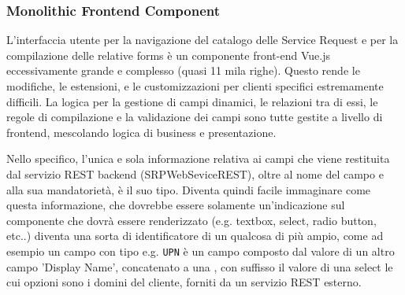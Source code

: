 \subsubsection{Monolithic Frontend Component}
L'interfaccia utente per la navigazione del catalogo delle Service Request e per la compilazione delle relative forms è un componente front-end Vue.js eccessivamente grande e complesso (quasi 11 mila righe). Questo rende le modifiche, le estensioni,  e le customizzazioni per clienti specifici estremamente difficili. La logica per la gestione di campi dinamici, le relazioni tra di essi, le regole di compilazione e la validazione dei campi sono tutte gestite a livello di frontend, mescolando logica di business e presentazione. 

Nello specifico, l'unica e sola informazione relativa ai campi che viene restituita dal servizio REST backend (SRPWebSeviceREST), oltre al nome del campo e alla sua mandatorietà, è il suo tipo. Diventa quindi facile immaginare come questa informazione, che dovrebbe essere solamente un'indicazione sul componente che dovrà essere renderizzato (e.g. textbox, select, radio button, etc..) diventa una sorta di identificatore di un qualcosa di più ampio, come ad esempio un campo con tipo e.g. \texttt{UPN} è un campo composto dal valore di un altro campo 'Display Name', concatenato a una \@, con suffisso il valore di una select le cui opzioni sono i domini del cliente, forniti da un servizio REST esterno.

